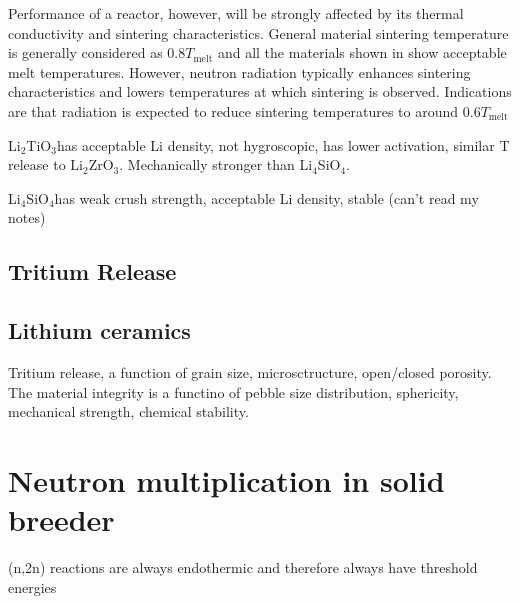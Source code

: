 \documentclass[11pt]{report} %
\newcommand{\lit}{Li$_2$TiO$_3$}
\newcommand{\lis}{Li$_4$SiO$_4$}
\newcommand{\liz}{Li$_2$ZrO$_3$}
\begin{document}
Performance of a reactor, however, will be strongly affected by its thermal conductivity and sintering characteristics. General material sintering temperature is generally considered as $0.8T_\text{melt}$ and all the materials shown in  show acceptable melt temperatures. However, neutron radiation typically enhances sintering characteristics and lowers temperatures at which sintering is observed. Indications are that radiation is expected to reduce sintering temperatures to around $0.6T_\text{melt}$


\lit has acceptable Li density, not hygroscopic, has lower activation, similar T release to \liz. Mechanically stronger than \lis.

\lis has weak crush strength, acceptable Li density, stable (can't read my notes)


\subsection{Tritium Release}


\subsection{Lithium ceramics}



Tritium release, a function of grain size, microsctructure, open/closed porosity. The material integrity is a functino of pebble size distribution, sphericity, mechanical strength, chemical stability.
























\section{Neutron multiplication in solid breeder}
(n,2n) reactions are always endothermic and therefore always have threshold energies
\end{document}
